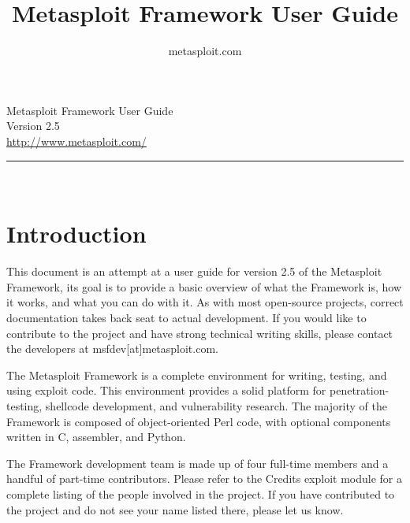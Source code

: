 \documentclass{report}
\begin{document}
\title{Metasploit Framework User Guide}
\author{metasploit.com}

\begin{titlepage}
    \begin{center}
        		

        \huge{Metasploit Framework User Guide}
		\ \\[10mm]
		\large{Version 2.5}
		\\[120mm]
		
        \small{\url{http://www.metasploit.com/}}

        \rule{10cm}{1pt} \\[4mm]
        \renewcommand{\arraystretch}{0.5}
    \end{center}
\end{titlepage}

\tableofcontents

\setlength{\parindent}{0pt} \setlength{\parskip}{8pt}



\chapter{Introduction}

\par
This document is an attempt at a user guide for version 2.5 of the Metasploit
Framework, its goal is to provide a basic overview of what the Framework is, how
it works, and what you can do with it. As with most open-source projects,
correct documentation takes back seat to actual development. If you would like
to contribute to the project and have strong technical writing skills, please
contact the developers at msfdev[at]metasploit.com.

\par
The Metasploit Framework is a complete environment for writing, testing, and
using exploit code. This environment provides a solid platform for
penetration-testing, shellcode development, and vulnerability research. The
majority of the Framework is composed of object-oriented Perl code, with
optional components written in C, assembler, and Python.  

\par
The Framework development team is made up of four full-time members and a handful
of part-time contributors. Please refer to the Credits exploit module for a complete
listing of the people involved in the project. If you have contributed to the project
and do not see your name listed there, please let us know.
\end{document}
